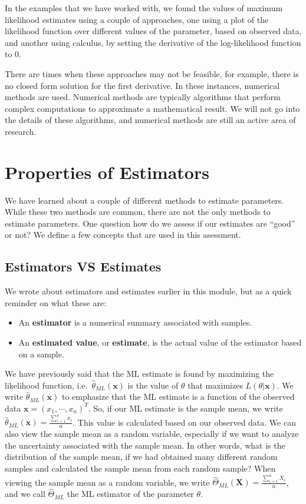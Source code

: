 \documentclass[
]{book}
\begin{document}
In the examples that we have worked with, we found the values of maximum likelihood estimates using a couple of approaches, one using a plot of the likelihood function over different values of the parameter, based on observed data, and another using calculus, by setting the derivative of the log-likelihood function to 0.

There are times when these approaches may not be feasible, for example, there is no closed form solution for the first derivative. In these instances, numerical methods are used. Numerical methods are typically algorithms that perform complex computations to approximate a mathematical result. We will not go into the details of these algorithms, and numerical methods are still an active area of research.

\section{Properties of Estimators}\label{estprops}

We have learned about a couple of different methods to estimate parameters. While these two methods are common, there are not the only methods to estimate parameters. One question how do we assess if our estimates are ``good'' or not? We define a few concepts that are used in this asessment.

\subsection{Estimators VS Estimates}\label{estimators-vs-estimates}

We wrote about estimators and estimates earlier in this module, but as a quick reminder on what these are:

\begin{itemize}
\item
  An \textbf{estimator} is a numerical summary associated with samples.
\item
  An \textbf{estimated value}, or \textbf{estimate}, is the actual value of the estimator based on a sample.
\end{itemize}

We have previously said that the ML estimate is found by maximizing the likelihood function, i.e.~\(\hat{\theta}_{ML}(\boldsymbol{x})\) is the value of \(\theta\) that maximizes \(L(\theta| \boldsymbol{x})\). We write \(\hat{\theta}_{ML}(\boldsymbol{x})\) to emphasize that the ML estimate is a function of the observed data \(\boldsymbol{x} = (x_1,\cdots, x_n)^T\). So, if our ML estimate is the sample mean, we write \(\hat{\theta}_{ML}(\boldsymbol{x}) = \frac{\sum_{i=1}^n x_i}{n}\). This value is calculated based on our observed data.
We can also view the sample mean as a random variable, especially if we want to analyze the uncertainty associated with the sample mean. In other words, what is the distribution of the sample mean, if we had obtained many different random samples and calculated the sample mean from each random sample? When viewing the sample mean as a random variable, we write \(\hat{\Theta}_{ML}(\boldsymbol{X}) = \frac{\sum_{i=1}^n X_i}{n}\), and we call \(\hat{\Theta}_{ML}\) the ML estimator of the parameter \(\theta\).
\end{document}
